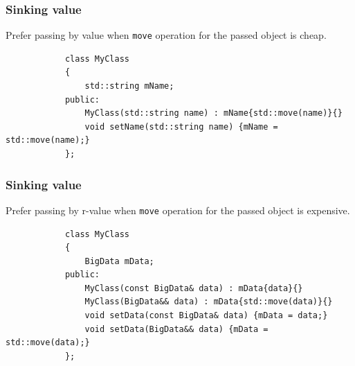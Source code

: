 \documentclass{beamer}
\begin{document}
\begin{frame}[fragile]
\frametitle{Sinking value}
	Prefer passing by value when \texttt{move} operation for the passed object is cheap.
	\begin{example}
		\begin{lstlisting}
			class MyClass
			{
				std::string mName;
			public:
				MyClass(std::string name) : mName{std::move(name)}{}
				void setName(std::string name) {mName = std::move(name);}	
			};	
		\end{lstlisting}
	\end{example}
\end{frame}

\begin{frame}[fragile]
\frametitle{Sinking value}
	Prefer passing by r-value when \texttt{move} operation for the passed object is expensive.
	\begin{example}
		\begin{lstlisting}
			class MyClass
			{
				BigData mData;
			public:
				MyClass(const BigData& data) : mData{data}{}
				MyClass(BigData&& data) : mData{std::move(data)}{}
				void setData(const BigData& data) {mData = data;}	
				void setData(BigData&& data) {mData = std::move(data);}		
			};	
		\end{lstlisting}
	\end{example}
\end{frame}
\end{document}
